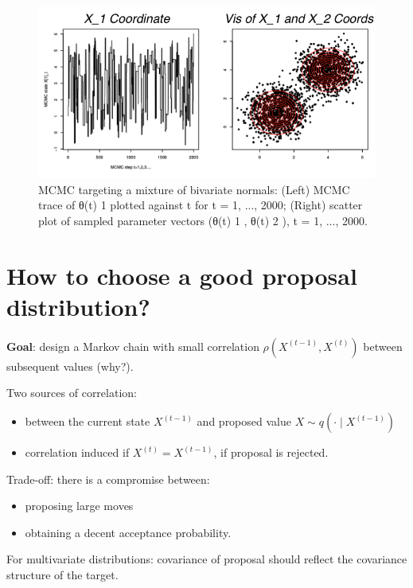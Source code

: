 \documentclass{article}
\begin{document}
\begin{figure}
    \centering
    \includegraphics[width=1\linewidth]{ox-hilary/bayes-methods/figures/Screenshot 2024-01-24 at 22.54.48.png}
    \caption{MCMC targeting a mixture of bivariate normals: (Left) MCMC trace of θ(t)  1 plotted  against t for t = 1, ..., 2000; (Right) scatter plot of sampled parameter vectors (θ(t)  1 , θ(t)  2 ), t =  1, ..., 2000. 
}
\end{figure}
\section{How to choose a good proposal distribution?}
\textbf{Goal}: design a Markov chain with small correlation $\rho\left(X^{(t-1)}, X^{(t)}\right)$ between subsequent values (why?).

Two sources of correlation:
\begin{itemize}
    \item between the current state $X^{(t-1)}$ and proposed value $X \sim q\left(\cdot \mid X^{(t-1)}\right)$
    \item correlation induced if $X^{(t)}=X^{(t-1)}$, if proposal is rejected.
\end{itemize}

Trade-off: there is a compromise between:
\begin{itemize}
    \item proposing large moves
    \item obtaining a decent acceptance probability.
\end{itemize}

For multivariate distributions: covariance of proposal should reflect the covariance structure of the target.
\end{document}
